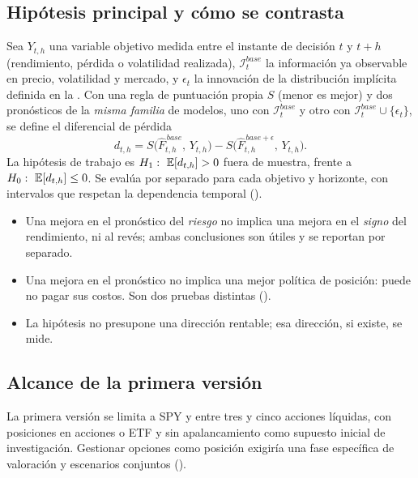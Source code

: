 \subsection{Hipótesis principal y cómo se contrasta}\label{sec:hipotesis}

Sea $Y_{t,h}$ una variable objetivo medida entre el instante de decisión $t$ y $t+h$ (rendimiento,
pérdida o volatilidad realizada), $\mathcal{I}^{base}_t$ la información ya observable en precio,
volatilidad y mercado, y $\epsilon_t$ la innovación de la distribución implícita definida en la
. Con una regla de puntuación propia $S$ (menor es mejor) y dos pronósticos de
la \emph{misma familia} de modelos, uno con $\mathcal{I}^{base}_t$ y otro con
$\mathcal{I}^{base}_t\cup\{\epsilon_t\}$, se define el diferencial de pérdida
\begin{equation}
d_{t,h}=S\bigl(\widehat F^{\,base}_{t,h},\,Y_{t,h}\bigr)-S\bigl(\widehat F^{\,base+\epsilon}_{t,h},\,Y_{t,h}\bigr).
\label{eq:diferencial}
\end{equation}
La hipótesis de trabajo es $H_1:\ \mathbb{E}[d_{t,h}]>0$ fuera de muestra, frente a $H_0:\ \E[d_{t,h}]\le 0$.
Se evalúa por separado para cada objetivo y horizonte, con intervalos que respetan la dependencia
temporal ().

\begin{noconcluir}
\begin{itemize}
\item Una mejora en el pronóstico del \emph{riesgo} no implica una mejora en el \emph{signo} del
rendimiento, ni al revés; ambas conclusiones son útiles y se reportan por separado.
\item Una mejora en el pronóstico no implica una mejor política de posición: puede no pagar sus
costos. Son dos pruebas distintas ().
\item La hipótesis no presupone una dirección rentable; esa dirección, si existe, se mide.
\end{itemize}
\end{noconcluir}

\subsection{Alcance de la primera versión}

La primera versión se limita a SPY y entre tres y cinco acciones líquidas, con posiciones en
acciones o ETF y sin apalancamiento como supuesto inicial de investigación. Gestionar opciones como
posición exigiría una fase específica de valoración y escenarios conjuntos ().

